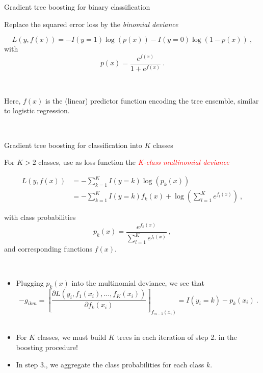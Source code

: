 \documentclass[
  10pt,
  ignorenonframetext,
]{beamer}
\providecommand{\tightlist}{%
  \setlength{\itemsep}{0pt}\setlength{\parskip}{0pt}}
\begin{document}
\begin{frame}
\begin{block}{Gradient tree boosting for binary classification}
\protect\hypertarget{gradient-tree-boosting-for-binary-classification}{}
\(~\)

Replace the squared error loss by the \emph{binomial deviance}

\[L(y,f(x)) = -I(y=1) \log(p(x)) - I(y=0) \log(1-p(x)) \ , \] with
\[p(x) = \frac{e^{f(x)}}{1+e^{f(x)}} \ .\]

\(~\)

Here, \(f(x)\) is the (linear) predictor function encoding the tree
ensemble, similar to logistic regression.

\(~\)
\end{block}
\end{frame}

\begin{frame}
\begin{block}{Gradient tree boosting for classification into \(K\)
classes}
\protect\hypertarget{gradient-tree-boosting-for-classification-into-k-classes}{}
\(~\)

For \(K>2\) classes, use as loss function the
\emph{\textcolor{red}{K-class multinomial deviance}}

\begin{align}
L(y,f(x)) &= -\sum_{k=1}^K I(y = k) \log (p_k(x)) \\ 
 & = -\sum_{k=1}^K I(y = k) f_k(x) + \log(\sum_{l=1}^K e^{f_l(x)}) \ ,
 \end{align}

with class probabilities
\[p_k(x) = \frac{e^{f_k(x)}}{\sum_{l=1}^K e^{f_l(x)}} \ , \] and
corresponding functions \(f(x)\).
\end{block}
\end{frame}

\begin{frame}
\(~\)

\begin{itemize}
\item
  Plugging \(p_k(x)\) into the multinomial deviance, we see that\\
  \[-g_{ikm} = \left[ \frac{\partial L(y_i, f_1(x_i),\ldots, f_K(x_i))}{\partial f_k(x_i)} \right]_{f_{m-1}(x_i)} = I(y_i =k) - p_k(x_i) \ .\]
  \(~\)
\item
  For \(K\) classes, we must build \(K\) trees in each iteration of step
  2. in the boosting procedure!
\end{itemize}

\vspace{2mm}

\begin{itemize}
\tightlist
\item
  In step 3., we aggregate the class probabilities for each class \(k\).
\end{itemize}
\end{frame}
\end{document}
